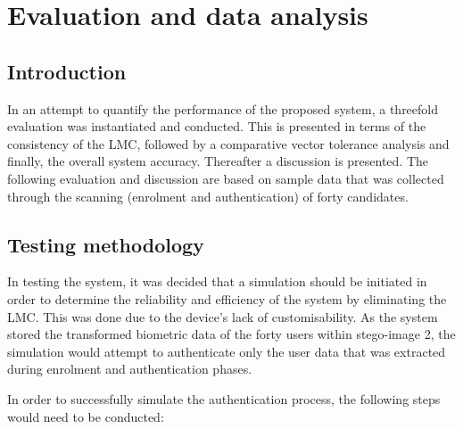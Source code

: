 \chapter{Evaluation and data analysis}


\section{Introduction}

In an attempt to quantify the performance of the proposed system, a threefold evaluation was instantiated and conducted. This is presented in terms of the consistency of the LMC, followed by a comparative vector tolerance analysis and finally, the overall system accuracy. Thereafter a discussion is presented. The following evaluation and discussion are based on sample data that was collected through the scanning (enrolment and authentication) of forty candidates.

\section{Testing methodology}


In testing the system, it was decided that a simulation should be initiated in order to determine the reliability and efficiency of the system by eliminating the LMC. This was done due to the device's lack of customisability. As the system stored the transformed biometric data of the forty users within stego-image 2, the simulation would attempt to authenticate only the user data that was extracted during enrolment and authentication phases. 

In order to successfully simulate the authentication process, the following steps would need to be conducted: 

